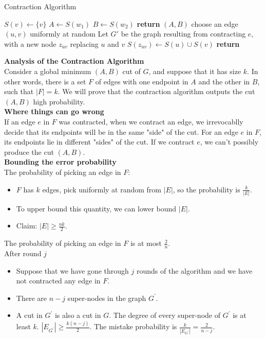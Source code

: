 \documentclass[onecolumn]{report}
\begin{document}
\begin{algorithm}[H]
\caption{Contraction Algorithm}
\begin{algorithmic}[1]
    \State $S(v) \gets \{v\}$
\EndFor
{}
    \State $A \gets S(w_1)$
    \State $B \gets S(w_2)$
    \State \textbf{return} $(A,B)$
\Else
    \State choose an edge $(u,v)$ uniformly at random
    \State Let $G'$ be the graph resulting from contracting $e$, with a new node $z_{uv}$ replacing $u$ and $v$
    \State $S(z_{uv}) \gets S(u) \cup S(v)$
    \State \textbf{return} 
\EndIf
\EndProcedure
\end{algorithmic}
\end{algorithm}
\textbf{Analysis of the Contraction Algorithm}\\
Consider a global minimum $(A,B)$ cut of $G$, and suppose that it has size $k$. In other words, there is a set $F$ of edges with one endpoint in $A$ and the other in $B$, such that $|F|=k$. We will prove that the contraction algorithm outputs the cut $(A,B)$ high probability.\\
\textbf{Where things can go wrong}\\
If an edge $e$ in $F$ was contracted, when we contract an edge, we irrevocablly decide that its endpoints will be in the same "side" of the cut. For an edge $e$ in $F$, its endpoints lie in different "sides" of the cut. If we contract $e$, we can't possibly produce the cut $(A,B)$.\\
\textbf{Bounding the error probability}\\
The probability of picking an edge in $F$: 
\begin{itemize}
    \item $F$ has $k$ edges, pick uniformly at random from $|E|$, so the probability is $\frac{k}{|E|}$.
    \item To upper bound this quantity, we can lower bound $|E|$.
    \item Claim: $|E| \geq \frac{nk}{2}$.
\end{itemize}
The probability of picking an edge in $F$ is at most $\frac{2}{n}$.\\
After round $j$
\begin{itemize}
    \item Suppose that we have gone through $j$ rounds of the algorithm and we have not contracted any edge in $F$.
    \item There are $n-j$ super-nodes in the graph $G^{\prime}$.
    \item A cut in $G^{\prime}$ is also a cut in $G$.
    \subitem The degree of every super-node of $G^{\prime}$ is at least $k$.
    \subitem $|E_{G^{\prime}}| \geq \frac{k(n-j)}{2}$.
    \subitem The mistake probability is $\frac{k}{|E_{G^{\prime}}|}=\frac{2}{n-j}$.
\end{itemize}
\end{document}

